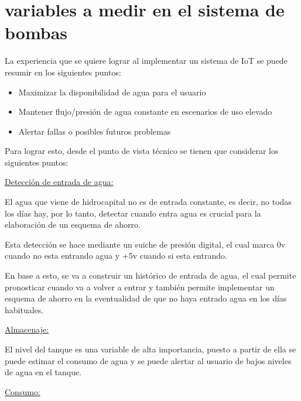 \documentclass[12pt]{article}
\begin{document}
	\section{variables a medir en el sistema de bombas}
	
	La experiencia que se quiere lograr al implementar un sistema de IoT se puede resumir en los siguientes puntos:
	
	\begin{itemize}
		\item Maximizar la disponibilidad de agua para el usuario
		\item Mantener flujo/presión de agua constante en escenarios de uso elevado
		\item Alertar fallas o posibles futuros problemas
	\end{itemize}
	
	Para lograr esto, desde el punto de vista técnico se tienen que considerar los siguientes puntos:
	
	\vspace{5mm}
	
	\underline{Detección de entrada de agua:}
	
	\vspace{5mm}
	
	El agua que viene de hidrocapital no es de entrada constante, es decir, no todas los días hay, por lo tanto, detectar cuando entra agua es crucial para la elaboración de un esquema de ahorro.
	
	Esta detección se hace mediante un suiche de presión digital, el cual marca 0v cuando no esta entrando agua y +5v cuando si esta entrando.
	
	En base a esto, se va a construir un histórico de entrada de agua, el cual permite pronosticar cuando va a volver a entrar y también permite implementar un esquema de ahorro en la eventualidad de que no haya entrado agua en los días habituales. 
	
	\vspace{5mm}
	
	\underline{Almacenaje:}
	
	\vspace{5mm}
	
	El nivel del tanque es una variable de alta importancia, puesto a partir de ella se puede estimar el consumo de agua y se puede alertar al usuario de bajos niveles de agua en el tanque.
	
	\vspace{15mm}
	
	\underline{Consumo:}
	
\end{document}

